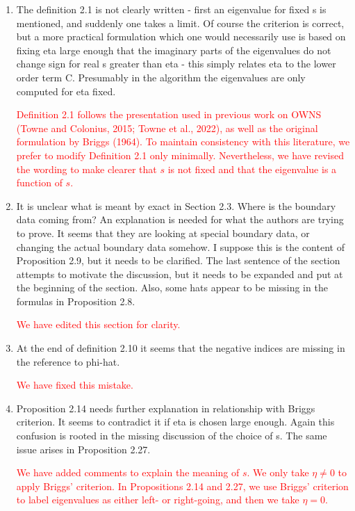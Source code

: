 \documentclass{article}
\newcommand{\response}[1]{\textcolor{red}{#1}}
\begin{document}
\begin{enumerate}
    \item The definition 2.1 is not clearly written - first an eigenvalue for fixed s is mentioned, and suddenly one takes a limit. Of course the criterion is correct, but a more practical formulation which one would necessarily use is based on fixing eta large enough that the imaginary parts of the eigenvalues do not change sign for real s greater than eta - this simply relates eta to the lower order term C. Presumably in the algorithm the eigenvalues are only computed for eta fixed.

    \response{Definition 2.1 follows the presentation used in previous work on OWNS (Towne and Colonius, 2015; Towne et al., 2022), as well as the original formulation by Briggs (1964). To maintain consistency with this literature, we prefer to modify Definition 2.1 only minimally. Nevertheless, we have revised the wording to make clearer that $s$ is not fixed and that the eigenvalue is a function of $s$.}
    
    \item It is unclear what is meant by exact in Section 2.3. Where is the boundary data coming from? An explanation is needed for what the authors are trying to prove. It seems that they are looking at special boundary data, or changing the actual boundary data somehow. I suppose this is the content of Proposition 2.9, but it needs to be clarified. The last sentence of the section attempts to motivate the discussion, but it needs to be expanded and put at the beginning of the section. Also, some hats appear to be missing in the formulas in Proposition 2.8.

    \response{We have edited this section for clarity.}

    
    \item At the end of definition 2.10 it seems that the negative indices are missing in the reference to phi-hat.

    \response{We have fixed this mistake.}
    
    \item Proposition 2.14 needs further explanation in relationship with Briggs criterion. It seems to contradict it if eta is chosen large enough. Again this confusion is rooted in the missing discussion of the choice of s. The same issue arises in Proposition 2.27.

    \response{We have added comments to explain the meaning of $s$. We only take $\eta\neq0$ to apply Briggs' criterion. In Propositions 2.14 and 2.27, we use Briggs' criterion to label eigenvalues as either left- or right-going, and then we take $\eta=0$.}
    

\end{enumerate}
\end{document}
